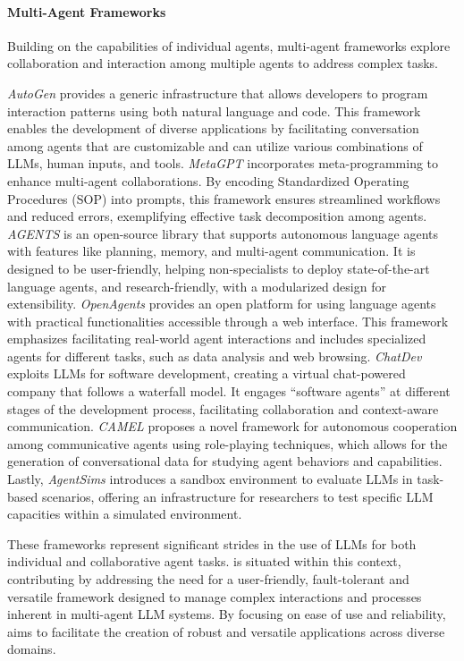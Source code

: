 \paragraph{Multi-Agent Frameworks}
Building on the capabilities of individual agents, multi-agent frameworks explore collaboration and interaction among multiple agents to address complex tasks.

\textit{AutoGen} \citep{auto-gen} provides a generic infrastructure that allows developers to program interaction patterns using both natural language and code. This framework enables the development of diverse applications by facilitating conversation among agents that are customizable and can utilize various combinations of LLMs, human inputs, and tools.
\textit{MetaGPT} \citep{meta-gpt} incorporates meta-programming to enhance multi-agent collaborations. By encoding Standardized Operating Procedures (SOP) into prompts, this framework ensures streamlined workflows and reduced errors, exemplifying effective task decomposition among agents.
\textit{AGENTS} \citep{Agents} is an open-source library that supports autonomous language agents with features like planning, memory, and multi-agent communication. It is designed to be user-friendly, helping non-specialists to deploy state-of-the-art language agents, and research-friendly, with a modularized design for extensibility.
\textit{OpenAgents} \citep{OpenAgents} provides an open platform for using language agents with practical functionalities accessible through a web interface. This framework emphasizes facilitating real-world agent interactions and includes specialized agents for different tasks, such as data analysis and web browsing.
\textit{ChatDev} \citep{ChatDev} exploits LLMs for software development, creating a virtual chat-powered company that follows a waterfall model. It engages ``software agents'' at different stages of the development process, facilitating collaboration and context-aware communication.
\textit{CAMEL} \citep{camel} proposes a novel framework for autonomous cooperation among communicative agents using role-playing techniques, which allows for the generation of conversational data for studying agent behaviors and capabilities.
Lastly, \textit{AgentSims} \citep{AgentSims} introduces a sandbox environment to evaluate LLMs in task-based scenarios, offering an infrastructure for researchers to test specific LLM capacities within a simulated environment.

These frameworks represent significant strides in the use of LLMs for both individual and collaborative agent tasks. \ours is situated within this context, contributing by addressing the need for a user-friendly, fault-tolerant and versatile framework designed to manage complex interactions and processes inherent in multi-agent LLM systems. By focusing on ease of use and reliability, \ours aims to facilitate the creation of robust and versatile applications across diverse domains.
